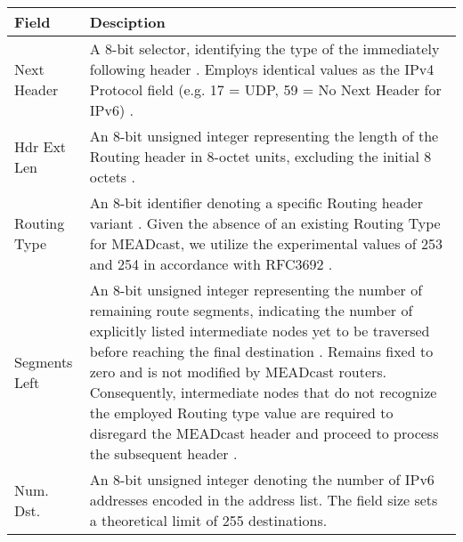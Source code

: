 \bgroup
\begin{table}[!htbp]
\centering
\def\arraystretch{1.35}%
\setlength{\tabcolsep}{1.2em}
\begin{tabularx}{\textwidth}{lX}
\toprule
\textbf{Field}& \textbf{Desciption} \\
\midrule
Next Header   & A 8-bit selector, identifying the type of the immediately
                following header \cite{rfc8200_ipv6_hdr}.
                Employs identical values as the IPv4 Protocol field (e.g. 17 =
                UDP, 59 = No Next Header for IPv6)
                \cite{iana_prot_nums}.\\
Hdr Ext Len   & An 8-bit unsigned integer representing the length of the
                Routing header in 8-octet units, excluding the initial 8
                octets \cite{rfc8200_ipv6_hdr}. \\
Routing Type  & An 8-bit identifier denoting a specific Routing header variant
                \cite{rfc8200_ipv6_hdr}.
                Given the absence of an existing Routing Type for MEADcast, we
                utilize the experimental values of 253 and 254 in accordance
                with RFC3692 \cite{rfc3692_ipv6_rt_type}.\\
Segments Left & An 8-bit unsigned integer representing the number of remaining
                route segments, indicating the number of explicitly listed
                intermediate nodes yet to be traversed before reaching the
                final destination \cite{rfc8200_ipv6_hdr}.
                Remains fixed to zero and is not modified by MEADcast routers.
                Consequently, intermediate nodes that do not recognize the
                employed Routing type value are required to disregard the
                MEADcast header and proceed to process the subsequent header
                \cite{rfc8200_ipv6_hdr}.\\
Num. Dst.     & An 8-bit unsigned integer denoting the number of IPv6
                addresses encoded in the address list.
                The field size sets a theoretical limit of 255 destinations.\\

\end{tabularx}
\end{table}
